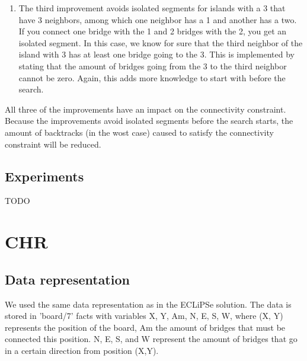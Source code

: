 \documentclass{report}
\begin{document}
\begin{enumerate}
	\item The third improvement avoids isolated segments for islands with a 3 that have 3 neighbors, among which one neighbor has a 1 and another has a two. If you connect one bridge with the 1 and 2 bridges with the 2, you get an isolated segment. In this case, we know for sure that the third neighbor of the island with 3 has at least one bridge going to the 3. This is implemented by stating that the amount of bridges going from the 3 to the third neighbor cannot be zero. Again, this adds more knowledge to start with before the search.
\end{enumerate}

All three of the improvements have an impact on the connectivity constraint. Because the improvements avoid isolated segments before the search starts, the amount of backtracks (in the wost case) caused to satisfy the connectivity constraint will be reduced.

\subsection{Experiments}
    TODO

\newpage
\section{CHR}
\subsection{Data representation}
We used the same data representation as in the ECLiPSe solution. The data is stored in 'board/7' facts with variables X, Y, Am, N, E, S, W, where (X, Y) represents the position of the board, Am the amount of bridges that must be connected this position. N, E, S, and W represent the amount of bridges that go in a certain direction from position (X,Y). 
\end{document}
